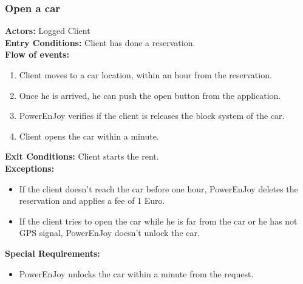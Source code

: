 \subsubsection{Open a car}
%
\textbf{Actors:}
Logged Client \\
%
\textbf{Entry Conditions:}
Client has done a reservation. \\
%
\textbf{Flow of events:}
\begin{enumerate}
\item Client moves to a car location, within an hour from the reservation.
\item Once he is arrived, he can push the open button from the application.
\item PowerEnJoy verifies if the client is  releases the block system of the car.
\item Client opens the car within a minute.
\end{enumerate}
%
\textbf{Exit Conditions:}
Client starts the rent. \\
%
\textbf{Exceptions:}
\begin{itemize}
\item If the client doesn't reach the car before one hour, PowerEnJoy deletes the reservation and applies a fee of 1 Euro.
\item If the client tries to open the car while he is far from the car or he has not GPS signal, PowerEnJoy doesn't unlock the car.
\end{itemize}
%
\textbf{Special Requirements:}
\begin{itemize}
\item PowerEnJoy unlocks the car within a minute from the request.
\end{itemize}



